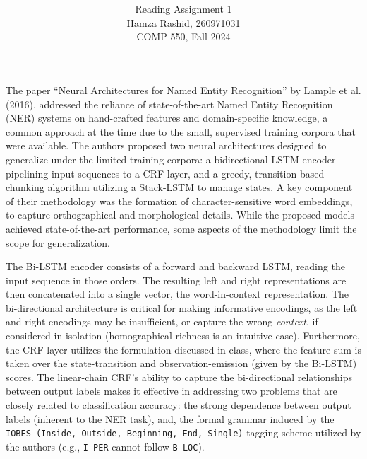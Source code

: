 \documentclass[11pt]{article}
\title{ }
\author{ Reading Assignment 1 \\ Hamza Rashid, 260971031 \\ COMP 550, Fall 2024}
\date{}
\begin{document}
\maketitle

\vspace{-5ex}
The paper  ``Neural Architectures for 
Named Entity Recognition'' by Lample et al. (2016), 
addressed the reliance of state-of-the-art 
Named Entity Recognition (NER) systems on 
hand-crafted  features and domain-specific knowledge, 
a common approach at the time due to the small, 
supervised training corpora that were available. 
The authors proposed two neural 
architectures designed to generalize 
under the limited training corpora: a 
bidirectional-LSTM encoder pipelining input sequences
to a CRF layer, and a greedy, transition-based 
chunking algorithm utilizing a Stack-LSTM to manage states. 
A key component of their methodology was
the formation of character-sensitive word 
embeddings, to capture orthographical and morphological 
details. While the proposed models achieved
state-of-the-art performance, some aspects
of the methodology limit the scope for generalization. 


The Bi-LSTM encoder consists of a forward and backward 
LSTM, reading the input sequence in those orders.
The resulting left and right representations are then concatenated
into a single vector, the word-in-context representation.
The bi-directional architecture is critical 
for making informative encodings, 
as the left and right encodings 
may be insufficient, or capture the wrong \textit{context},
if considered in isolation
(homographical richness is an intuitive case). 
Furthermore, the CRF layer utilizes the formulation
discussed in class, where the feature sum is taken 
over the state-transition and observation-emission (given by the Bi-LSTM) scores.
The linear-chain CRF's ability to capture the bi-directional
relationships between output labels makes it effective in addressing 
two problems that are closely related to classification accuracy: 
the strong dependence between output labels (inherent to the NER task), 
and, the formal grammar induced by the \texttt{IOBES (Inside, Outside, Beginning, End, Single)}
tagging scheme utilized by the authors (e.g., \texttt{I-PER} cannot follow \texttt{B-LOC}).
\end{document}
